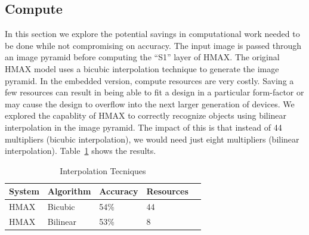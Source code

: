 \subsection{Compute}
In this section we explore the potential savings in computational work needed to be done while not compromising on accuracy. The input image 
is passed through an image pyramid before computing the ``S1'' layer of HMAX. The original HMAX model uses a bicubic interpolation technique 
to generate the image pyramid. In the embedded version, compute resources are very costly. Saving a few resources can result in being able to 
fit a design in a particular form-factor or may cause the design to overflow into the next larger generation of devices. We explored the 
capablity of HMAX to correctly recognize objects using bilinear interpolation in the image pyramid. The impact of this is that instead of 
44 multipliers (bicubic interpolation), we would need just eight multipliers (bilinear interpolation). Table~\ref{table:compute} shows the 
results. 

\begin{table}[h]
\renewcommand{\arraystretch}{1.3}
\caption {Interpolation Tecniques}
\label{table:compute}
\begin{tabular}{lllll}
 System & Algorithm & Accuracy & Resources\\\hline
 HMAX	& Bicubic   & 54\% & 44\\\hline
 HMAX   & Bilinear  & 53\% & 8\\\hline
\end{tabular}
\end{table}

